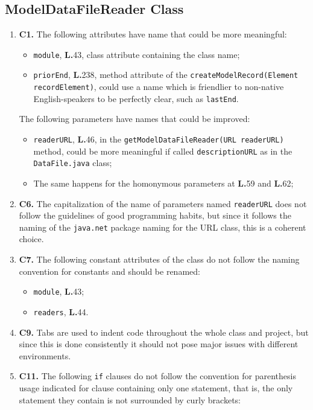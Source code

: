 \subsection{ModelDataFileReader Class}
\begin{enumerate}
\item \textbf{C1.} The following attributes have name that could be more meaningful:
	\begin{itemize}
	\item \texttt{module}, \textbf{L.}43, class attribute containing the class name;
	\item \texttt{priorEnd}, \textbf{L.}238, method attribute of the \texttt{createModelRecord(Element recordElement)}, could use a name which is friendlier to non-native English-speakers to be perfectly clear, such as \texttt{lastEnd}.
	\end{itemize}	
The following parameters have names that could be improved:
	\begin{itemize}
	\item \texttt{readerURL}, \textbf{L.}46, in the \texttt{getModelDataFileReader(URL readerURL)} method, could be more meaningful if called \texttt{descriptionURL} as in the \texttt{DataFile.java} class;
	\item The same happens for the homonymous parameters at \textbf{L.}59 and \textbf{L.}62;
	\end{itemize}
\item \textbf{C6.} The capitalization of the name of parameters named \texttt{readerURL} does not follow the guidelines of good programming habits, but since it follows the naming of the \texttt{java.net} package naming for the URL class, this is a coherent choice.
\item \textbf{C7.} The following constant attributes of the class do not follow the naming convention for constants and should be renamed:
	\begin{itemize}
	\item \texttt{module}, \textbf{L.}43;
	\item \texttt{readers}, \textbf{L.}44.
	\end{itemize}
\item \textbf{C9.} Tabs are used to indent code throughout the whole class and project, but since this is done consistently it should not pose major issues with different environments.
\item \textbf{C11.} The following \texttt{if} clauses do not follow the convention for parenthesis usage indicated for clause containing only one statement, that is, the only statement they contain is not surrounded by curly brackets:

\end{enumerate}
